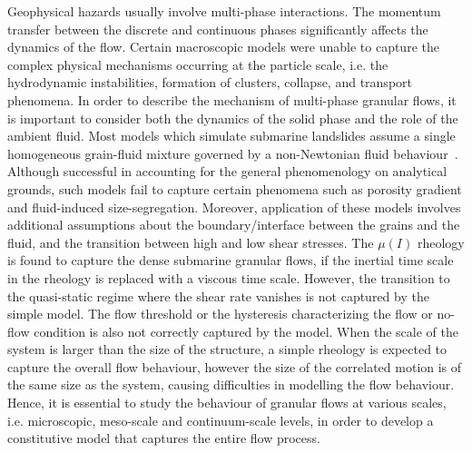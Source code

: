 Geophysical hazards usually involve multi-phase interactions. The momentum 
transfer between the discrete and continuous phases significantly affects the 
dynamics of the flow. Certain macroscopic models were unable to capture the 
complex physical mechanisms occurring at the particle scale, i.e. the 
hydrodynamic instabilities, formation of clusters, collapse, and transport 
phenomena. In order to describe the mechanism of multi-phase granular flows, it 
is important to consider both the dynamics of the solid phase and the role of 
the ambient fluid. Most models which simulate submarine landslides assume a 
single homogeneous grain-fluid mixture governed by a non-Newtonian fluid 
behaviour~\citep{Denlinger2001,Iverson2000}. Although successful in accounting 
for the general phenomenology on analytical grounds, such models fail to 
capture certain phenomena such as porosity gradient and fluid-induced 
size-segregation. Moreover, application of these models involves additional 
assumptions about the boundary/interface between the grains and the fluid, and 
the transition between high and low shear stresses. The $\mu(\textit{I})$ 
rheology is found to capture the dense submarine granular flows, if the 
inertial time scale in the rheology is replaced with a viscous time scale. 
However, the transition to the quasi-static regime where the shear rate 
vanishes is not captured by the simple model. The flow threshold or the 
hysteresis characterizing the flow or no-flow condition is also not correctly 
captured by the model. When the scale of the system is larger than the size of 
the structure, a simple rheology is expected to capture the overall flow 
behaviour, however the size of the correlated motion is of the same size as the 
system, causing difficulties in modelling the flow behaviour. Hence, it is 
essential to study the behaviour of granular flows at various scales, i.e. 
microscopic, meso-scale and continuum-scale levels, in order to develop a 
constitutive model that captures the entire flow process.


